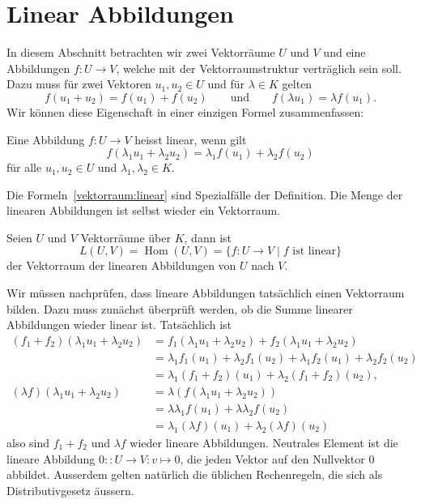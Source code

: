 %
%
%
\section{Linear Abbildungen}
In diesem Abschnitt betrachten wir zwei Vektorräume $U$ und $V$ und
eine Abbildungen $f\colon U\to V$, welche mit der Vektorraumstruktur
verträglich sein soll. 
Dazu muss für zwei Vektoren $u_1,u_2\in U$ und für $\lambda\in K$ gelten
\begin{equation}
f(u_1+u_2)=f(u_1)+f(u_2)
\qquad\text{und}\qquad
f(\lambda u_1)=\lambda f(u_1).
\label{vektorraum:linear}
\end{equation}
Wir können diese Eigenschaft in einer einzigen Formel zusammenfassen:

\begin{definition}
Eine Abbildung $f\colon U\to V$ heisst linear, wenn gilt
\[
f(\lambda_1 u_1+\lambda_2 u_2)=\lambda_1 f(u_1) + \lambda_2 f(u_2)
\]
für alle $u_1,u_2\in U$ und $\lambda_1,\lambda_2\in K$.
\end{definition}

Die Formeln~\eqref{vektorraum:linear} sind Spezialfälle der Definition.
Die Menge der linearen Abbildungen ist selbst wieder ein Vektorraum.

\begin{definition}
Seien $U$ und $V$ Vektorräume über $K$, dann ist
\[
L(U,V)
=
\operatorname{Hom}(U,V)
=
\{f\colon U\to V\;|\; \text{$f$ ist linear}\}
\]
der Vektorraum der linearen Abbildungen von $U$ nach $V$.
\end{definition}

Wir müssen nachprüfen, dass lineare Abbildungen tatsächlich einen
Vektorraum bilden. 
Dazu muss zunächst überprüft werden, ob die Summe linearer Abbildungen
wieder linear ist.
Tatsächlich ist
\begin{align*}
(f_1+f_2)(\lambda_1u_1+\lambda_2 u_2)
&=
f_1(\lambda_1u_1+\lambda_2 u_2)
+
f_2(\lambda_1u_1+\lambda_2 u_2)
\\
&=
\lambda_1f_1(u_1)+\lambda_2f_1(u_2)
+
\lambda_1f_2(u_1)+\lambda_2 f_2(u_2)
\\
&=
\lambda_1(f_1 + f_2)(u_1)+\lambda_2(f_1+f_2)(u_2),
\\
(\lambda f)(\lambda_1 u_1 + \lambda_2 u_2)
&=
\lambda (f(\lambda_1 u_1 + \lambda_2 u_2))
\\
&=
\lambda\lambda_1 f(u_1)
+
\lambda\lambda_2 f(u_2)
\\
&=
\lambda_1 (\lambda f)(u_1)
+
\lambda_2 (\lambda f)(u_2)
\end{align*}
also sind $f_1+f_2$ und $\lambda f$ wieder lineare Abbildungen.
Neutrales Element ist die lineare Abbildung $0:\colon U\to V:v\mapsto 0$,
die jeden Vektor auf den Nullvektor $0$ abbildet.
Ausserdem gelten natürlich die üblichen Rechenregeln, die sich als
Distributivgesetz äussern.


